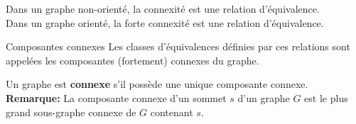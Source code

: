 \documentclass[french, 11pt]{article}
\begin{document}
\begin{prop}{}{}
    Dans un graphe non-orienté, la connexité est une relation d'équivalence.\\
    Dans un graphe orienté, la forte connexité est une relation d'équivalence.
\end{prop}

\vspace*{-0.7cm}

\begin{defi}{Composantes connexes}{}
    Les classes d'équivalences définies par ces relations sont appelées les composantes (fortement) connexes du graphe.
\end{defi}

\vspace*{-0.7cm}

\begin{defi}{}{}
    Un graphe est \textbf{connexe} s'il possède une unique composante connexe.\\
    \textbf{Remarque:} La composante connexe d'un sommet $s$ d'un graphe $G$ est le plus grand sous-graphe connexe de $G$ contenant $s$. 
\end{defi}

\vspace*{-0.7cm}
\end{document}

